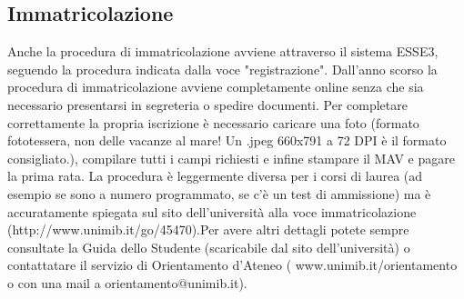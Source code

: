 \subsection{Immatricolazione}
Anche la procedura di immatricolazione avviene attraverso il sistema ESSE3, seguendo la procedura indicata dalla voce "registrazione". Dall'anno scorso la procedura di immatricolazione avviene completamente online senza che sia necessario presentarsi in segreteria o spedire documenti. Per completare correttamente la propria iscrizione è necessario caricare una foto (formato fototessera, non delle vacanze al mare! Un .jpeg 660x791 a 72 DPI è il formato consigliato.), compilare tutti i campi richiesti e infine stampare il MAV e pagare la prima rata.
La procedura è leggermente diversa per i corsi di laurea (ad esempio se sono a numero programmato, se c'è un test di ammissione) ma è accuratamente spiegata sul sito dell'università alla voce immatricolazione (http://www.unimib.it/go/45470).Per avere altri dettagli potete sempre consultate la Guida dello Studente (scaricabile dal sito dell'università) o contattatare il servizio di Orientamento d'Ateneo ( www.unimib.it/orientamento o con una mail a orientamento@unimib.it).
